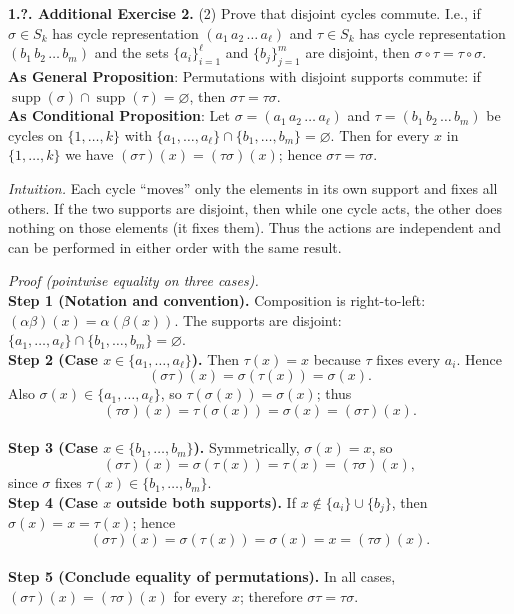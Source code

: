 \documentclass[12pt]{article}
\theoremstyle{definition}
\begin{document}
\newpage

\noindent \textbf{1.?. Additional Exercise 2.}
(2) Prove that disjoint cycles commute. I.e., if $\sigma\in S_k$ has cycle representation $(a_1\,a_2\,\dots\,a_\ell)$ and $\tau\in S_k$ has cycle representation $(b_1\,b_2\,\dots\,b_m)$ and the sets $\{a_i\}_{i=1}^\ell$ and $\{b_j\}_{j=1}^m$ are disjoint, then $\sigma\circ\tau=\tau\circ\sigma$.\\ %

\noindent\textbf{As General Proposition}: Permutations with disjoint supports commute: if $\operatorname{supp}(\sigma)\cap\operatorname{supp}(\tau)=\varnothing$, then $\sigma\tau=\tau\sigma$.\\

\noindent \textbf{As Conditional Proposition}: Let $\sigma=(a_1\,a_2\,\dots\,a_\ell)$ and $\tau=(b_1\,b_2\,\dots\,b_m)$ be cycles on $\{1,\dots,k\}$ with $\{a_1,\dots,a_\ell\}\cap\{b_1,\dots,b_m\}=\varnothing$. Then for every $x$ in $\{1,\dots,k\}$ we have $(\sigma\tau)(x)=(\tau\sigma)(x)$; hence $\sigma\tau=\tau\sigma$.\\

\newpage

\dotfill

\emph{Intuition.} Each cycle “moves” only the elements in its own support and fixes all others. If the two supports are disjoint, then while one cycle acts, the other does nothing on those elements (it fixes them). Thus the actions are independent and can be performed in either order with the same result.\\

\dotfill

\emph{Proof (pointwise equality on three cases).}\\
\textbf{Step 1 (Notation and convention).} Composition is right-to-left: $(\alpha\beta)(x)=\alpha(\beta(x))$. The supports are disjoint: $\{a_1,\dots,a_\ell\}\cap\{b_1,\dots,b_m\}=\varnothing$.\\
\textbf{Step 2 (Case $x\in\{a_1,\dots,a_\ell\}$).} Then $\tau(x)=x$ because $\tau$ fixes every $a_i$. Hence
\[
(\sigma\tau)(x)=\sigma(\tau(x))=\sigma(x).
\]
Also $\sigma(x)\in\{a_1,\dots,a_\ell\}$, so $\tau(\sigma(x))=\sigma(x)$; thus
\[
(\tau\sigma)(x)=\tau(\sigma(x))=\sigma(x)=(\sigma\tau)(x).
\]\\
\textbf{Step 3 (Case $x\in\{b_1,\dots,b_m\}$).} Symmetrically, $\sigma(x)=x$, so
\[
(\sigma\tau)(x)=\sigma(\tau(x))=\tau(x)=(\tau\sigma)(x),
\]
since $\sigma$ fixes $\tau(x)\in\{b_1,\dots,b_m\}$.\\
\textbf{Step 4 (Case $x$ outside both supports).} If $x\notin\{a_i\}\cup\{b_j\}$, then $\sigma(x)=x=\tau(x)$; hence
\[
(\sigma\tau)(x)=\sigma(\tau(x))=\sigma(x)=x=(\tau\sigma)(x).
\]\\
\textbf{Step 5 (Conclude equality of permutations).} In all cases, $(\sigma\tau)(x)=(\tau\sigma)(x)$ for every $x$; therefore $\sigma\tau=\tau\sigma$.\\
\end{document}
